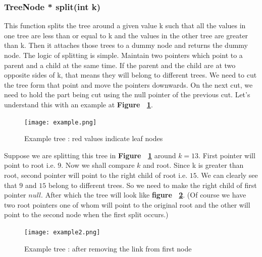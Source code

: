 \documentclass{article}
\begin{document}
\subsubsection{TreeNode * split(int k)}
This function splits the tree around a given value k such that all the values in one tree are less than or equal to k and the values in the other tree are greater than k. Then it attaches those trees to a dummy node and returns the dummy node.\newline
The logic of splitting is simple. Maintain two pointers which point to a parent and a child at the same time. If the parent and the child are at two opposite sides of k, that means they will belong to different trees. We need to cut the tree form that point and move the pointers downwards. On the next cut, we need to hold the part being cut using the null pointer of the previous cut. Let's understand this with an example at \textbf{Figure ~\ref{fig:ex1}}.
\begin{figure}
\texttt{[image: example.png]}
\caption{Example tree : red values indicate leaf nodes}
\label{fig:ex1}
\end{figure}
Suppose we are splitting this tree in \textbf{Figure ~\ref{fig:ex1}} around $k=13$. First pointer will point to root i.e. $9$. Now we shall compare $k$ and root. Since k is greater than root, second pointer will point to the right child of root i.e. $15$. We can clearly see that $9$ and $15$ belong to different trees. So we need to make the right child of first pointer $null$. After which the tree will look like \textbf{figure ~\ref{fig:ex2}}. (Of course we have two root pointers one of whom will point to the original root and the other will point to the second node when the first split occurs.)
\begin{figure}
\texttt{[image: example2.png]}
\caption{Example tree : after removing the link from first node}
\label{fig:ex2}
\end{figure}
\end{document}
